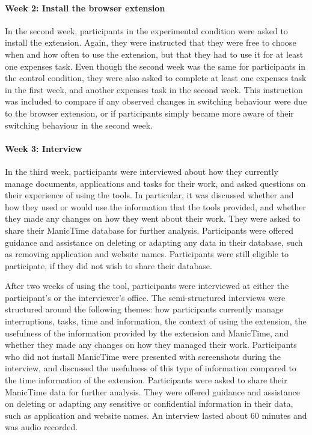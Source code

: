 \paragraph{Week 2: Install the browser extension}
In the second week, participants in the experimental condition were asked to install the extension. Again, they were instructed that they were free to choose when and how often to use the extension, but that they had to use it for at least one expenses task. Even though the second week was the same for participants in the control condition, they were also asked to complete at least one expenses task in the first week, and another expenses task in the second week. This instruction was included to compare if any observed changes in switching behaviour were due to the browser extension, or if participants simply became more aware of their switching behaviour in the second week.

\paragraph{Week 3: Interview}
In the third week, participants were interviewed about how they currently manage documents, applications and tasks for their work, and asked questions on their experience of using the tools. In particular, it was discussed whether and how they used or would use the information that the tools provided, and whether they made any changes on how they went about their work. They were asked to share their ManicTime database for further analysis. Participants were offered guidance and assistance on deleting or adapting any data in their database, such as removing application and website names. Participants were still eligible to participate, if they did not wish to share their database.

After two weeks of using the tool, participants were interviewed at either the participant’s or the interviewer’s office. The semi-structured interviews were structured around the following themes: how participants currently manage interruptions, tasks, time and information, the context of using the extension, the usefulness of the information provided by the extension and ManicTime, and whether they made any changes on how they managed their work. Participants who did not install ManicTime were presented with screenshots during the interview, and discussed the usefulness of this type of information compared to the time information of the extension. Participants were asked to share their ManicTime data for further analysis. They were offered guidance and assistance on deleting or adapting any sensitive or confidential information in their data, such as application and website names. An interview lasted about 60 minutes and was audio recorded. 

